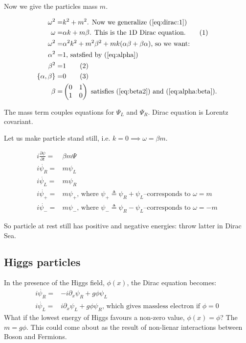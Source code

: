 \documentclass[]{article}
\newcommand\numberthis{\addtocounter{equation}{1}\tag{\theequation}}
\begin{document}
Now we give the particles mass $m$.

\begin{align*}
	\omega^2 =& k^2 + m^2 \text{. Now we generalize (\ref{eq:dirac:1})}\\
	\omega =& \alpha k + m \beta \text{. This is the 1D Dirac equation.} \numberthis \label{eq:Dirac:1D}\\
	\omega^2 =& \alpha^2 k^2 + m^2 \beta^2 + m k (\alpha \beta + \beta \alpha) \text{, so we want:}\\
	\alpha^2 =& 1 \text{, satsfied by (\ref{eq:alpha})}\\
	\beta^2 =& 1 \numberthis \label{eq:beta2}\\ 
	\{\alpha,\beta\} =& 0 \numberthis \label{eq:alpha:beta}\\
	\beta =& \begin{pmatrix}
	0 & 1\\
	1 & 0
	\end{pmatrix} \text{ satisfies (\ref{eq:beta2}) and (\ref{eq:alpha:beta}).}
\end{align*}

The mass term couples equations for $\Psi_L$ and $\Psi_R$. Dirac equation is Lorentz covariant.

Let us make particle stand still, i.e. $k=0 \implies \omega = \beta m$.

\begin{align*}
	i \frac{\partial \psi}{\partial t} =& \beta m \Psi\\
	i \dot{\psi_R} =& m \psi_L\\
	i \dot{\psi_L} =&  m \psi_R \\
	i \dot{\psi_+} =&  m \psi_+ \text{, where $\psi_+\triangleq\psi_R + \psi_L$--corresponds to $\omega=m$}\\
	i \dot{\psi_-} =&  m \psi_- \text{, where $\psi_-\triangleq\psi_R - \psi_L$--corresponds to $\omega=-m$}
\end{align*}

So particle at rest still has positive and negative energies: throw latter in Dirac Sea.

\subsection{Higgs particles}

In the presence of the Higgs field, $\phi(x)$, the Dirac equation becomes:
\begin{align*}
i \dot{\psi_R} =& -i \partial_x \psi_R + g \phi \psi_L\\
i \dot{\psi_L} =& i \partial_x \psi_L + g \phi \psi_R \text{, which gives massless electron if $\phi=0$}
\end{align*}
What if the lowest energy of Higgs favours a non-zero value, $\phi(x)=\phi$? The $m=g\phi$. This could come about as the result of non-lienar interactions between Boson and Fermions.
\end{document}
